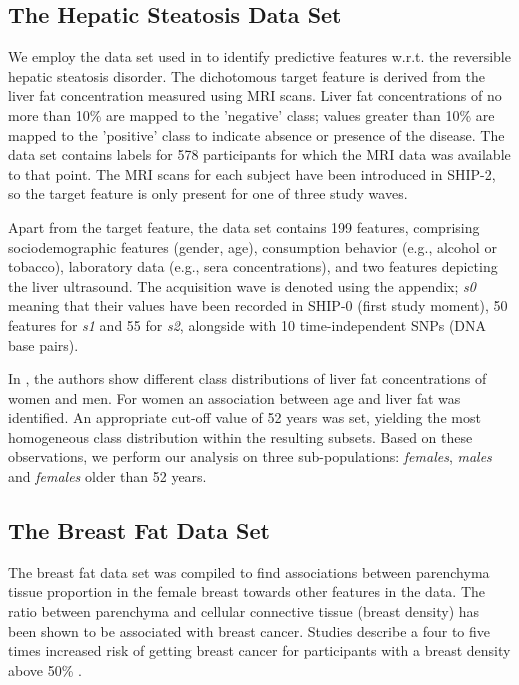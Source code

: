 \documentclass[journal]{style/vgtc} 			          %
\begin{document}
\subsection{The Hepatic Steatosis Data Set}
We employ the data set used in \cite{Niemann2014} to identify predictive features w.r.t. the reversible hepatic steatosis disorder.
The dichotomous target feature is derived from the liver fat concentration measured using MRI scans.
Liver fat concentrations of no more than 10\% are mapped to the 'negative' class; values greater than 10\% are mapped to the 'positive' class to indicate absence or presence of the disease.
The data set contains labels for 578 participants for which the MRI data was available to that point.
The MRI scans for each subject have been introduced in SHIP-2, so the target feature is only present for one of three study waves.

Apart from the target feature, the data set contains 199 features, comprising sociodemographic features (gender, age), consumption behavior (e.g., alcohol or tobacco), laboratory data (e.g., sera concentrations), and two features depicting the liver ultrasound.
The acquisition wave is denoted using the appendix; \emph{s0} meaning that their values have been recorded in SHIP-0 (first study moment), 50 features for \emph{s1} and 55 for \emph{s2}, alongside with 10 time-independent SNPs (DNA base pairs).

In \cite{Niemann2014}, the authors show different class distributions of liver fat concentrations of women and men.
For women an association between age and liver fat was identified.
An appropriate cut-off value of 52 years was set, yielding the most homogeneous class distribution within the resulting subsets.
Based on these observations, we perform our analysis on three sub-populations: \emph{females}, \emph{males} and \emph{females} older than 52 years.
\subsection{The Breast Fat Data Set}
The breast fat data set was compiled to find associations between parenchyma tissue proportion in the female breast towards other features in the data.
The ratio between parenchyma and cellular connective tissue (breast density) has been shown to be associated with breast cancer.
Studies describe a four to five times increased risk of getting breast cancer for participants with a breast density above 50\% \cite{Mccormack2006}.
\end{document}
